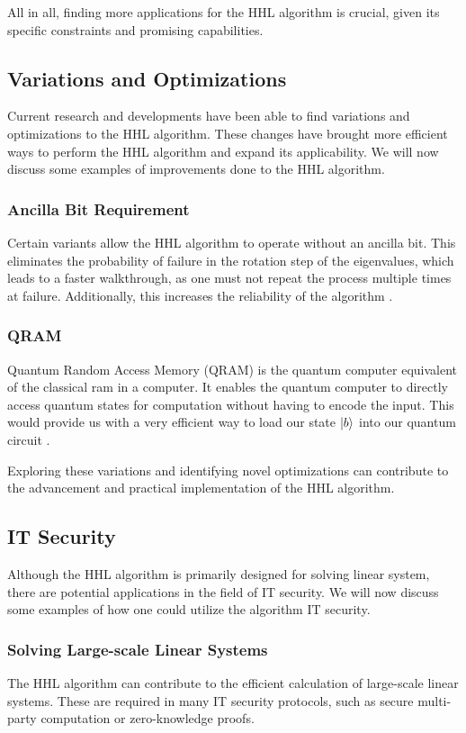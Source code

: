 All in all, finding more applications for the HHL algorithm is crucial, given its specific constraints and promising capabilities.

\subsection{Variations and Optimizations}
Current research and developments have been able to find variations and optimizations to the HHL algorithm.
These changes have brought more efficient ways to perform the HHL algorithm and expand its applicability.
We will now discuss some examples of improvements done to the HHL algorithm.

    \subsubsection{Ancilla Bit Requirement} 
    Certain variants allow the HHL algorithm to operate without an ancilla bit.
    This eliminates the probability of failure in the rotation step of the eigenvalues, which leads to a faster walkthrough, as one must not repeat the process multiple times at failure.
    Additionally, this increases the reliability of the algorithm \cite{without_ancilla}.

    \subsubsection{QRAM}
    Quantum Random Access Memory (QRAM) is the quantum computer equivalent of the classical ram in a computer.
    It enables the quantum computer to directly access quantum states for computation without having to encode the input. 
    This would provide us with a very efficient way to load our state $\ket b$ into our quantum circuit \cite{qram}.

Exploring these variations and identifying novel optimizations can contribute to the advancement and practical implementation of the HHL algorithm.


\subsection{IT Security}
Although the HHL algorithm is primarily designed for solving linear system, there are potential applications in the field of IT security.
We will now discuss some examples of how one could utilize the algorithm IT security.

    \subsubsection{Solving Large-scale Linear Systems}
    The HHL algorithm can contribute to the efficient calculation of large-scale linear systems.
    These are required in many IT security protocols, such as secure multi-party computation or zero-knowledge proofs. 

